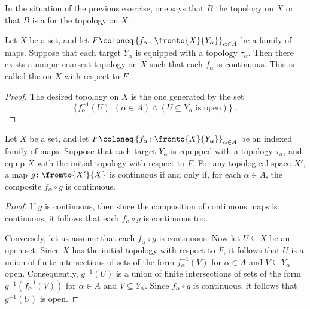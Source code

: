 \begin{dfn}
	In the situation of the previous exercise, one says that $B$  the topology on $X$ or that $B$ is a  for the topology on $X$.
\end{dfn}

\begin{prp}
	Let $X$ be a set, and let
	$ F \coloneq \left\{ f_{\alpha} \colon \fromto{X}{Y_{\alpha}} \right\}_{\alpha\in A} $
	be a family of maps.
	Suppose that each target $Y_{\alpha}$ is equipped with a topology $\tau_{\alpha}$.
	Then there exists a unique coarsest topology on $X$ such that each $f_{\alpha}$ is continuous.
	This is called the  on $X$ with respect to $F$.
\end{prp}

\begin{proof}
	The desired topology on $X$ is the one generated by the set
	\[
		\{f_{\alpha}^{-1}(U) : (\alpha\in A)\wedge(U\subseteq Y_{\alpha}\text{ is open}) \} \period
	\]
\end{proof}

\begin{prp}
	Let $X$ be a set, and let
	$ F \coloneq \left\{ f_{\alpha} \colon \fromto{X}{Y_{\alpha}} \right\}_{\alpha\in A} $
	be an indexed family of maps.
	Suppose that each target $Y_{\alpha}$ is equipped with a topology $\tau_{\alpha}$, and
	equip $X$ with the initial topology with respect to $F$.
	For any topological space $X'$, a map $g \colon \fromto{X'}{X}$ is continuous if and only if, for each $\alpha\in A$, the composite $f_{\alpha}\circ g$ is continuous.
\end{prp}

\begin{proof}
	If $g$ is continuous, then since the composition of continuous maps is continuous, it follows that each $f_{\alpha} \circ g$ is continuous too.

	Conversely, let us assume that each $f_{\alpha} \circ g$ is continuous.
	Now let $ U \subseteq X$ be an open set.
	Since $X$ has the initial topology with respect to $F$, it follows that $U$ is a union of finite intersections of sets of the form $f_{\alpha}^{-1}(V)$ for $ \alpha \in A$ and $V \subseteq Y_{\alpha} $ open.
	Consequently, $g^{-1}(U)$ is a union of finite intersections of sets of the form $g^{-1}(f_{\alpha}^{-1}(V))$ for $\alpha \in A$ and $ V \subseteq Y_{\alpha}$.
	Since $f_{\alpha} \circ g$ is continuous, it follows that $ g^{-1}(U)$ is open.
\end{proof}

